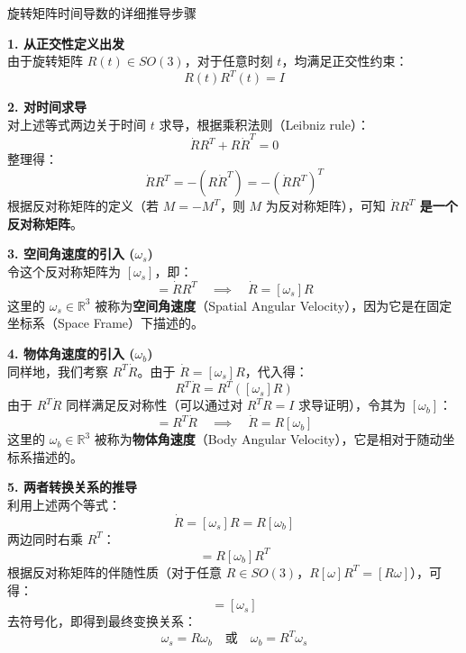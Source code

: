 \begin{mybox}{旋转矩阵时间导数的详细推导步骤}

\textbf{1. 从正交性定义出发} \\
由于旋转矩阵 $R(t) \in SO(3)$，对于任意时刻 $t$，均满足正交性约束：
\begin{equation}
    R(t)R^T(t) = I
\end{equation}

\textbf{2. 对时间求导} \\
对上述等式两边关于时间 $t$ 求导，根据乘积法则（Leibniz rule）：
\begin{equation}
    \dot{R}R^T + R\dot{R}^T = 0
\end{equation}
整理得：
\begin{equation}
    \dot{R}R^T = -(R\dot{R}^T) = -(\dot{R}R^T)^T
\end{equation}
根据反对称矩阵的定义（若 $M = -M^T$，则 $M$ 为反对称矩阵），可知 \textbf{$\dot{R}R^T$ 是一个反对称矩阵}。

\textbf{3. 空间角速度的引入 ($\omega_s$)} \\
令这个反对称矩阵为 $[\omega_s]$，即：
\begin{equation}
    [\omega_s] = \dot{R}R^T \quad \implies \quad \dot{R} = [\omega_s]R
\end{equation}
这里的 $\omega_s \in \mathbb{R}^3$ 被称为\textbf{空间角速度}（Spatial Angular Velocity），因为它是在固定坐标系（Space Frame）下描述的。

\textbf{4. 物体角速度的引入 ($\omega_b$)} \\
同样地，我们考察 $R^T\dot{R}$。由于 $\dot{R} = [\omega_s]R$，代入得：
\begin{equation}
    R^T\dot{R} = R^T([\omega_s]R)
\end{equation}
由于 $R^T\dot{R}$ 同样满足反对称性（可以通过对 $R^T R = I$ 求导证明），令其为 $[\omega_b]$：
\begin{equation}
    [\omega_b] = R^T\dot{R} \quad \implies \quad \dot{R} = R[\omega_b]
\end{equation}
这里的 $\omega_b \in \mathbb{R}^3$ 被称为\textbf{物体角速度}（Body Angular Velocity），它是相对于随动坐标系描述的。



\textbf{5. 两者转换关系的推导} \\
利用上述两个等式：
\begin{equation}
    \dot{R} = [\omega_s]R = R[\omega_b]
\end{equation}
两边同时右乘 $R^T$：
\begin{equation}
    [\omega_s] = R[\omega_b]R^T
\end{equation}
根据反对称矩阵的伴随性质（对于任意 $R \in SO(3)$，$R[\omega]R^T = [R\omega]$），可得：
\begin{equation}
    [R\omega_b] = [\omega_s]
\end{equation}
去符号化，即得到最终变换关系：
\begin{equation}
    \omega_s = R\omega_b \quad \text{或} \quad \omega_b = R^T\omega_s
\end{equation}

\end{mybox}


